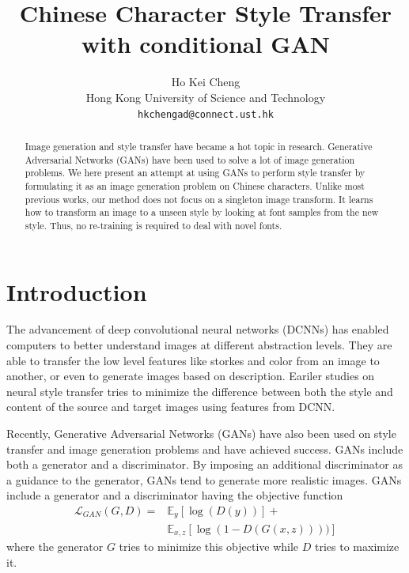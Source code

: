 \documentclass[10pt,twocolumn,letterpaper]{article}
\begin{document}
\title{Chinese Character Style Transfer with conditional GAN}

\author{Ho Kei Cheng\\
Hong Kong University of Science and Technology\\
{\tt\small hkchengad@connect.ust.hk}
}

\maketitle

\begin{abstract}
	Image generation and style transfer have became a hot topic in research. 
	Generative Adversarial Networks (GANs) have been used to solve a lot of image generation
	problems. We here present an attempt at using GANs to perform style transfer by formulating
	it as an image generation problem on Chinese characters. Unlike most previous works, 
	our method does not focus on a singleton image transform. It learns how to transform an image
	to a unseen style by looking at font samples from the new style. Thus, no re-training is required
	to deal with novel fonts.
\end{abstract}

\section{Introduction}
The advancement of deep convolutional neural networks (DCNNs) has enabled computers
to better understand images at different abstraction levels. 
They are able to transfer the low level features like storkes and color
from an image to another, or even to generate images based on description.
Eariler studies on neural style transfer tries to minimize the difference 
between both the style and content of the source and target images using 
features from DCNN. \cite{DBLP:journals/corr/JohnsonAL16} \cite{Authors04} \cite{Authors03}

Recently, Generative Adversarial Networks (GANs) have also been used on
style transfer and image generation problems and have achieved success. GANs include both a generator and a discriminator. By imposing an additional discriminator as a guidance to the generator, GANs tend to generate more realistic images.
GANs include a generator and a discriminator having the objective function
\begin{align*}
\mathcal{L}_{GAN}(G, D)=&\mathbb{E}_{y}[\log(D(y))] +  \\&\mathbb{E}_{x,z}[\log(1-D(G(x,z))))]
\end{align*}
where the generator $G$ tries to minimize this objective while $D$ tries to maximize it. \cite{DBLP:journals/corr/RadfordMC15}
\end{document}
